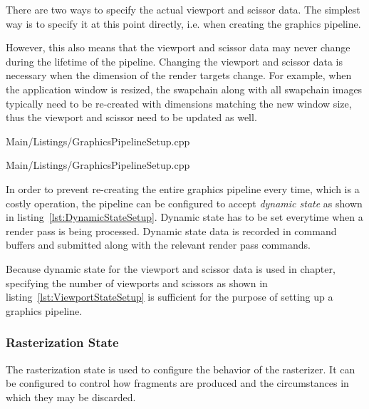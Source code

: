        There are two ways to specify the actual viewport and scissor data.
        The simplest way is to specify it at this point directly, i.e. when creating the graphics pipeline.

        However, this also means that the viewport and scissor data may never change during the lifetime of the pipeline.
        Changing the viewport and scissor data is necessary when the dimension of the render targets change.
        For example, when the application window is resized, the swapchain along with all swapchain images typically need to be re-created with dimensions matching the new window size, thus the viewport and scissor need to be updated as well.

        
        {Main/Listings/GraphicsPipelineSetup.cpp}

        
        {Main/Listings/GraphicsPipelineSetup.cpp}

        In order to prevent re-creating the entire graphics pipeline every time, which is a costly operation, the pipeline can be configured to accept \textit{dynamic state} as shown in listing~\ref{lst:DynamicStateSetup}.
        Dynamic state has to be set everytime when a render pass is being processed.
        Dynamic state data is recorded in command buffers and submitted along with the relevant render pass commands.

        Because dynamic state for the viewport and scissor data is used in chapter, specifying the number of viewports and scissors as shown in listing~\ref{lst:ViewportStateSetup} is sufficient for the purpose of setting up a graphics pipeline.

      \subsubsection{Rasterization State}
        The rasterization state is used to configure the behavior of the rasterizer.
        It can be configured to control how fragments are produced and the circumstances in which they may be discarded.

